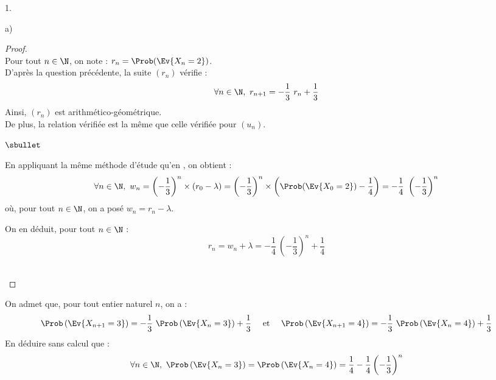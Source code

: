 \documentclass[11pt]{article}%
\begin{document}
\begin{noliste}{1.}
\begin{noliste}{a)}
    \begin{proof}~\\%
      Pour tout $n \in \N$, on note : $r_n = \Prob(\Ev{X_n = 2})$.\\
      D'après la question précédente, la suite $(r_n)$ vérifie :
      \[
      \forall n \in \N, \ r_{n+1} = - \dfrac{1}{3} \ r_n + \dfrac{1}{3}
      \]
      Ainsi, $(r_n)$ est arithmético-géométrique.\\
      De plus, la relation vérifiée est la même que celle vérifiée pour
      $(u_n)$.
      \begin{noliste}{$\sbullet$}
      \item En appliquant la même méthode d'étude qu'en ,
        on obtient :
        \[
        \forall n \in \N, \ w_n = \left( - \dfrac{1}{3} \right)^n
        \times (r_0 - \lambda) = \left( - \dfrac{1}{3} \right)^n
        \times \left(\Prob(\Ev{X_0 = 2}) - \dfrac{1}{4} \right) =
        -\dfrac{1}{4} \ \left( - \dfrac{1}{3} \right)^n
        \]
        où, pour tout $n \in \N$, on a posé $w_n = r_n - \lambda$.

      \item On en déduit, pour tout $n \in \N$ :
        \[
        r_n = w_n + \lambda = -\dfrac{1}{4} \ \left( - \dfrac{1}{3}
        \right)^n + \dfrac{1}{4}
        \]        
      \end{noliste}
    ~\\[-1.4cm]
    \end{proof}

  \end{noliste}
  
\item On admet que, pour tout entier naturel $n$, on a :
  \[
  \Prob\left(\Ev{X_{n + 1} = 3}\right) = -\dfrac{1}{3} \ 
  \Prob\left(\Ev{X_{n} = 3}\right) + \dfrac{1}{3} \quad \hbox{ et }
  \quad \Prob\left(\Ev{X_{n + 1} = 4}\right) = -\dfrac{1}{3} \ 
  \Prob\left(\Ev{X_{n} = 4}\right) + \dfrac{1}{3}
  \]
  En déduire sans calcul que :
  \[
  \forall n \in \N, \ \Prob\left(\Ev{X_{n} = 3}\right) =
  \Prob\left(\Ev{X_{n} = 4}\right) =
  \dfrac{1}{4}-\dfrac{1}{4}\left(-\dfrac{1}{3}\right)^{n}
  \]


\end{noliste}
\end{document}
